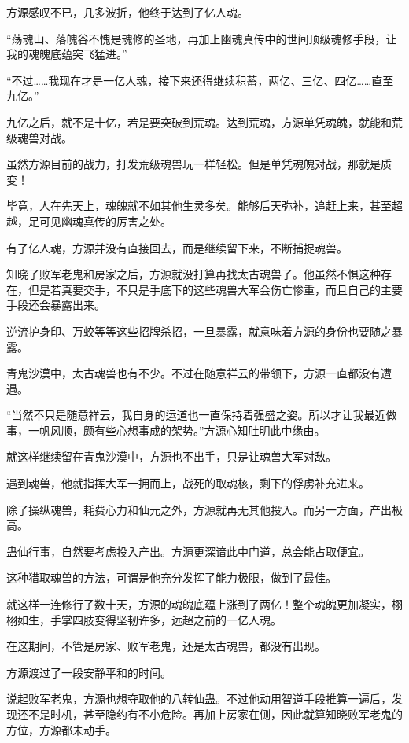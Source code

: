 
\begin{this_body}

方源感叹不已，几多波折，他终于达到了亿人魂。

“荡魂山、落魄谷不愧是魂修的圣地，再加上幽魂真传中的世间顶级魂修手段，让我的魂魄底蕴突飞猛进。”

“不过……我现在才是一亿人魂，接下来还得继续积蓄，两亿、三亿、四亿……直至九亿。”

九亿之后，就不是十亿，若是要突破到荒魂。达到荒魂，方源单凭魂魄，就能和荒级魂兽对战。

虽然方源目前的战力，打发荒级魂兽玩一样轻松。但是单凭魂魄对战，那就是质变！

毕竟，人在先天上，魂魄就不如其他生灵多矣。能够后天弥补，追赶上来，甚至超越，足可见幽魂真传的厉害之处。

有了亿人魂，方源并没有直接回去，而是继续留下来，不断捕捉魂兽。

知晓了败军老鬼和房家之后，方源就没打算再找太古魂兽了。他虽然不惧这种存在，但是若真要交手，不只是手底下的这些魂兽大军会伤亡惨重，而且自己的主要手段还会暴露出来。

逆流护身印、万蛟等等这些招牌杀招，一旦暴露，就意味着方源的身份也要随之暴露。

青鬼沙漠中，太古魂兽也有不少。不过在随意祥云的带领下，方源一直都没有遭遇。

“当然不只是随意祥云，我自身的运道也一直保持着强盛之姿。所以才让我最近做事，一帆风顺，颇有些心想事成的架势。”方源心知肚明此中缘由。

就这样继续留在青鬼沙漠中，方源也不出手，只是让魂兽大军对敌。

遇到魂兽，他就指挥大军一拥而上，战死的取魂核，剩下的俘虏补充进来。

除了操纵魂兽，耗费心力和仙元之外，方源就再无其他投入。而另一方面，产出极高。

蛊仙行事，自然要考虑投入产出。方源更深谙此中门道，总会能占取便宜。

这种猎取魂兽的方法，可谓是他充分发挥了能力极限，做到了最佳。

就这样一连修行了数十天，方源的魂魄底蕴上涨到了两亿！整个魂魄更加凝实，栩栩如生，手掌四肢变得坚韧许多，远超之前的一亿人魂。

在这期间，不管是房家、败军老鬼，还是太古魂兽，都没有出现。

方源渡过了一段安静平和的时间。

说起败军老鬼，方源也想夺取他的八转仙蛊。不过他动用智道手段推算一遍后，发现还不是时机，甚至隐约有不小危险。再加上房家在侧，因此就算知晓败军老鬼的方位，方源都未动手。


\end{this_body}

